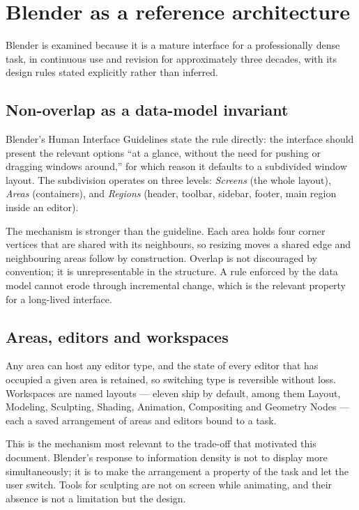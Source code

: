 \documentclass[11pt,a4paper]{article}
\begin{document}
\section{Blender as a reference architecture}

Blender is examined because it is a mature interface for a professionally dense
task, in continuous use and revision for approximately three decades, with its
design rules stated explicitly rather than inferred.

\subsection{Non-overlap as a data-model invariant}

Blender's Human Interface Guidelines state the rule directly: the interface
should present the relevant options ``at a glance, without the need for pushing
or dragging windows around,'' for which reason it defaults to a subdivided
window layout. The subdivision operates on three levels: \emph{Screens} (the
whole layout), \emph{Areas} (containers), and \emph{Regions} (header, toolbar,
sidebar, footer, main region inside an editor).

The mechanism is stronger than the guideline. Each area holds four corner
vertices that are shared with its neighbours, so resizing moves a shared edge
and neighbouring areas follow by construction. Overlap is not discouraged by
convention; it is unrepresentable in the structure. A rule enforced by the data
model cannot erode through incremental change, which is the relevant property
for a long-lived interface.

\subsection{Areas, editors and workspaces}

Any area can host any editor type, and the state of every editor that has
occupied a given area is retained, so switching type is reversible without loss.
Workspaces are named layouts --- eleven ship by default, among them Layout,
Modeling, Sculpting, Shading, Animation, Compositing and Geometry Nodes --- each
a saved arrangement of areas and editors bound to a task.

This is the mechanism most relevant to the trade-off that motivated this
document. Blender's response to information density is not to display more
simultaneously; it is to make the arrangement a property of the task and let
the user switch. Tools for sculpting are not on screen while animating, and
their absence is not a limitation but the design.
\end{document}
